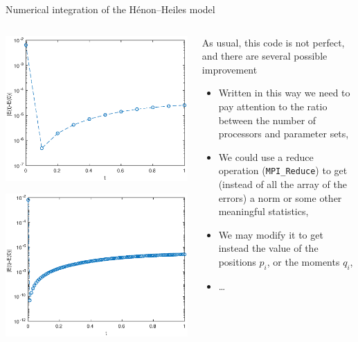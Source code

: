 \documentclass[xcolor={svgnames,usenames}]{beamer}
\begin{document}
\begin{frame}{Numerical integration of the H\'enon--Heiles model}
\begin{columns}
	\begin{column}{0.45\columnwidth}
		\includegraphics[width=\columnwidth]{figure1.eps}
		
		\includegraphics[width=\columnwidth]{figure2.eps}
	\end{column}
\begin{column}{0.55\columnwidth}
As usual, this code is not perfect, and there are several possible improvement
\begin{itemize}
	\item Written in this way we need to pay attention to the ratio between the number of processors and parameter sets,
	\item We could use a reduce operation (\texttt{MPI_Reduce}) to get (instead of all the array of the errors) a norm or some other meaningful statistics,
	\item We may modify it to get instead the value of the positions $p_i$, or the moments $q_i$,
	\item \ldots
\end{itemize}
\end{column}
\end{columns}
\end{frame}
\end{document}
